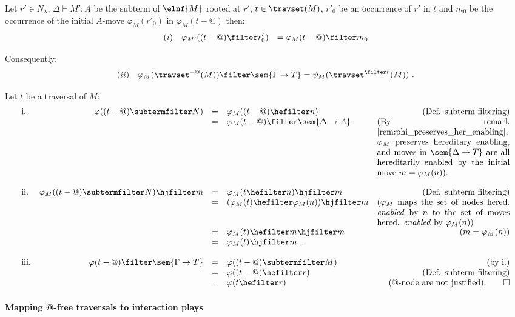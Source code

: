 \begin{lemma}
\label{lem:varphi_filter}
Let $r'\in N_\lambda$, $\Delta \vdash M' : A$ be the subterm of $\elnf{M}$ rooted at $r'$, $t\in\travset(M)$, $r'_0$ be an occurrence of $r'$ in $t$
and $m_0$ be the occurrence of the initial $A$-move $\varphi_M(r'_0)$ in $\varphi_M(t-@)$ then:
\begin{eqnarray*}
(i)& \quad \varphi_{M'}((t-@)\filter r'_0) &= \varphi_M(t-@) \filter m_0
\end{eqnarray*}

Consequently:
$$(ii) \quad  \varphi_M(\travset^{-@}(M)) \filter \sem{\Gamma \rightarrow T} = \psi_M(\travset^{\filter r}(M))\ .$$
\end{lemma}
\proof Let $t$ be a traversal of $M$:
$$\begin{array}{lrclr}
\mbox{i.}& \varphi( (t-@) \subtermfilter N ) &=& \varphi_M((t-@) \hefilter n ) & \mbox{(Def. subterm filtering)}\\
          &&=& \varphi_M(t-@) \filter \sem{\Delta \rightarrow A}  & \parbox[t]{5.5cm}{(By remark \ref{rem:phi_preserves_her_enabling}, $\varphi_M$ preserves hereditary enabling,  and  moves in $\sem{\Delta \rightarrow T}$ are all hereditarily enabled by the initial move $m = \varphi_M(n)$).} \\
\\
\mbox{ii.}& \varphi_M((t-@)\subtermfilter N) \hjfilter m
  &=& \varphi_M(t\hefilter n) \hjfilter m & \mbox{(Def. subterm filtering)}\\
  &&=& ( \varphi_M(t) \hefilter \varphi_M(n) ) \hjfilter m & \parbox[t]{5.5cm}{($\varphi_M$ maps the set of nodes hered. \emph{enabled} by $n$ to the set of moves hered. \emph{enabled} by $\varphi_M(n)$)} \\
  &&=& \varphi_M(t) \hefilter  m \hjfilter m & \mbox{($m = \varphi_M(n)$)} \\
  &&=& \varphi_M(t) \hjfilter m \ . \\
  \\
\mbox{iii.} & \varphi(t-@) \filter \sem{\Gamma \rightarrow T}
             &=& \varphi( (t-@) \subtermfilter M ) & \mbox{(by i.)} \\
           &&=& \varphi( (t-@) \hefilter r ) & \mbox{(Def. subterm filtering)} \\
           &&=& \varphi( t \hefilter r ) & \mbox{(@-node are not justified).} \qed
\end{array}$$

\paragraph{Mapping @-free traversals to interaction plays}
\hfill

